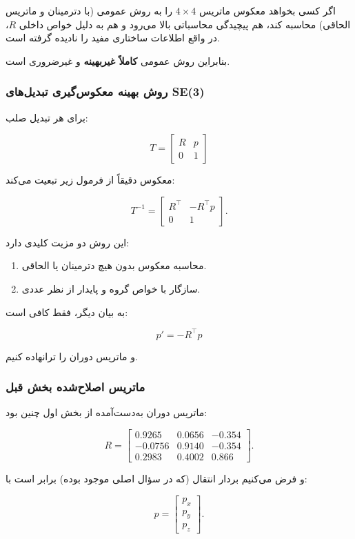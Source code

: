 \documentclass{article}
\begin{document}
اگر کسی بخواهد معکوس ماتریس $4\times 4$ را به روش عمومی (با دترمینان و ماتریس الحاقی) محاسبه کند، هم پیچیدگی محاسباتی بالا می‌رود و هم به دلیل خواص داخلی $R$، در واقع اطلاعات ساختاری مفید را نادیده گرفته است.

بنابراین روش عمومی \textbf{کاملاً غیربهینه} و غیرضروری است.

\subsubsection{روش بهینه معکوس‌گیری تبدیل‌های SE(3)}

برای هر تبدیل صلب:

\[
T=
\begin{bmatrix}
	R & p \\
	0 & 1
\end{bmatrix}
\]

معکوس دقیقاً از فرمول زیر تبعیت می‌کند:

\[
T^{-1}=
\begin{bmatrix}
	R^\top & -R^\top p \\
	0 & 1
\end{bmatrix}.
\]

این روش دو مزیت کلیدی دارد:

\begin{enumerate}
	\item محاسبه معکوس بدون هیچ دترمینان یا الحاقی.
	\item سازگار با خواص گروه  و پایدار از نظر عددی.
\end{enumerate}

به بیان دیگر، فقط کافی است:

\[
p' = -R^\top p
\]

و ماتریس دوران را ترانهاده کنیم.

\subsubsection{ماتریس اصلاح‌شده بخش قبل}

ماتریس دوران به‌دست‌آمده از بخش اول چنین بود:

\[
R=
\begin{bmatrix}
	0.9265 & 0.0656 & -0.354 \\
	-0.0756 & 0.9140 & -0.354 \\
	0.2983 & 0.4002 & 0.866
\end{bmatrix}.
\]

و فرض می‌کنیم بردار انتقال (که در سؤال اصلی موجود بوده) برابر است با:

\[
p=
\begin{bmatrix}
	p_x \\ p_y \\ p_z
\end{bmatrix}.
\]
\end{document}
